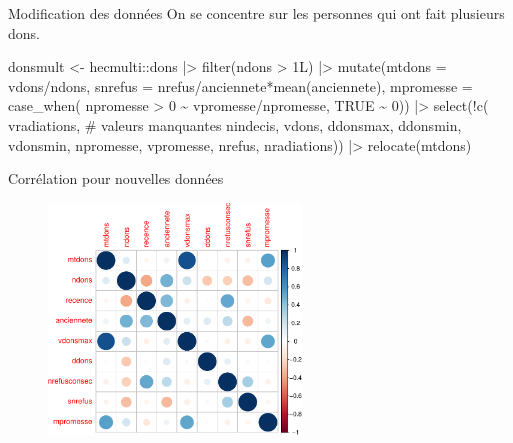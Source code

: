\documentclass[
  ignorenonframetext,
]{beamer}
\newenvironment{Shaded}{\begin{snugshade}}{\end{snugshade}}
\newcommand{\AttributeTok}[1]{\textcolor[rgb]{0.40,0.45,0.13}{#1}}
\newcommand{\CommentTok}[1]{\textcolor[rgb]{0.37,0.37,0.37}{#1}}
\newcommand{\ConstantTok}[1]{\textcolor[rgb]{0.56,0.35,0.01}{#1}}
\newcommand{\DecValTok}[1]{\textcolor[rgb]{0.68,0.00,0.00}{#1}}
\newcommand{\FunctionTok}[1]{\textcolor[rgb]{0.28,0.35,0.67}{#1}}
\newcommand{\NormalTok}[1]{\textcolor[rgb]{0.00,0.23,0.31}{#1}}
\newcommand{\OtherTok}[1]{\textcolor[rgb]{0.00,0.23,0.31}{#1}}
\newcommand{\SpecialCharTok}[1]{\textcolor[rgb]{0.37,0.37,0.37}{#1}}
\begin{document}
\begin{frame}[fragile]{Modification des données}
\protect\hypertarget{modification-des-donnuxe9es}{}
On se concentre sur les personnes qui ont fait plusieurs dons.

\begin{Shaded}
\begin{Highlighting}[numbers=left,,]
\NormalTok{donsmult }\OtherTok{\textless{}{-}}\NormalTok{ hecmulti}\SpecialCharTok{::}\NormalTok{dons }\SpecialCharTok{|\textgreater{}}
  \FunctionTok{filter}\NormalTok{(ndons }\SpecialCharTok{\textgreater{}}\NormalTok{ 1L) }\SpecialCharTok{|\textgreater{}}
  \FunctionTok{mutate}\NormalTok{(}\AttributeTok{mtdons =}\NormalTok{ vdons}\SpecialCharTok{/}\NormalTok{ndons,}
         \AttributeTok{snrefus =}\NormalTok{ nrefus}\SpecialCharTok{/}\NormalTok{anciennete}\SpecialCharTok{*}\FunctionTok{mean}\NormalTok{(anciennete),}
         \AttributeTok{mpromesse =} \FunctionTok{case\_when}\NormalTok{(}
\NormalTok{           npromesse }\SpecialCharTok{\textgreater{}} \DecValTok{0} \SpecialCharTok{\textasciitilde{}}\NormalTok{ vpromesse}\SpecialCharTok{/}\NormalTok{npromesse,}
           \ConstantTok{TRUE} \SpecialCharTok{\textasciitilde{}} \DecValTok{0}\NormalTok{)) }\SpecialCharTok{|\textgreater{}}
  \FunctionTok{select}\NormalTok{(}\SpecialCharTok{!}\FunctionTok{c}\NormalTok{(}
\NormalTok{    vradiations, }\CommentTok{\# valeurs manquantes}
\NormalTok{    nindecis, vdons, ddonsmax,}
\NormalTok{    ddonsmin, vdonsmin, npromesse,}
\NormalTok{    vpromesse, nrefus, nradiations)) }\SpecialCharTok{|\textgreater{}}
  \FunctionTok{relocate}\NormalTok{(mtdons)}
\end{Highlighting}
\end{Shaded}
\end{frame}

\begin{frame}{Corrélation pour nouvelles données}
\protect\hypertarget{corruxe9lation-pour-nouvelles-donnuxe9es}{}
\begin{figure}

{\centering \includegraphics[width=0.6\textwidth,height=\textheight]{MATH60602-diapos11_files/figure-beamer/unnamed-chunk-6-1.pdf}

}

\end{figure}
\end{frame}
\end{document}
